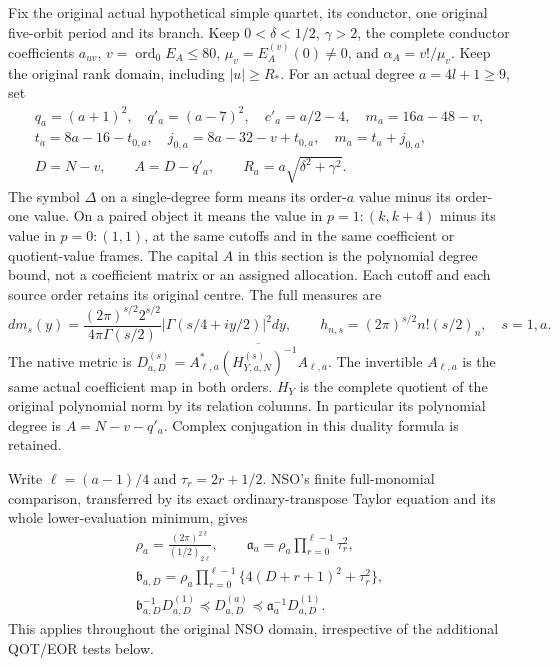 \documentclass[11pt,a4paper]{article}
\begin{document}
Fix the original actual hypothetical simple quartet, its conductor,
one original five-orbit period and its branch. Keep
$0<\delta<1/2$, $\gamma>2$, the complete conductor coefficients
$a_{uv}$, $v=\operatorname{ord}_0E_A\le80$,
$\mu_v=E_A^{(v)}(0)\ne0$, and $\alpha_A=v!/\mu_v$.
Keep the original rank domain, including $|u|\ge R_*$.
For an actual degree $a=4l+1\ge9$, set
\[
\begin{gathered}
q_a=(a+1)^2,\quad q'_a=(a-7)^2,\quad c'_a=a/2-4,\quad
m_a=16a-48-v,\\
t_a=8a-16-t_{0,a},\quad
j_{0,a}=8a-32-v+t_{0,a},\quad m_a=t_a+j_{0,a},\\
D=N-v,\qquad A=D-q'_a,\qquad R_a=a\sqrt{\delta^2+\gamma^2}.
\end{gathered}\tag{EFP1}\label{efp:data}
\]
The symbol $\Delta$ on a single-degree form means its order-$a$ value
minus its order-one value. On a paired object it means the value in
$p=1:(k,k+4)$ minus its value in $p=0:(1,1)$, at the same cutoffs
and in the same coefficient or quotient-value frames.
The capital $A$ in this section is the polynomial degree bound, not a
coefficient matrix or an assigned allocation. Each cutoff and each source
order retains its original centre. The full measures are
\[
dm_s(y)=\frac{(2\pi)^{s/2}2^{s/2}}{4\pi\Gamma(s/2)}
 |\Gamma(s/4+iy/2)|^2dy,\qquad
h_{n,s}=(2\pi)^{s/2}n!(s/2)_n,\quad s=1,a.
\tag{EFP2}\label{efp:measure}
\]
The native metric is
$D_{a,D}^{(s)}=A_{\ell,a}^*\overline{(H_{Y,a,N}^{(s)})^{-1}}A_{\ell,a}$.
The invertible $A_{\ell,a}$ is the same actual coefficient map in both
orders. $H_Y$ is the complete quotient of the original polynomial
norm by its relation columns. In particular its polynomial degree is
$A=N-v-q'_a$. Complex conjugation in this duality formula is retained.

Write $\ell=(a-1)/4$ and $\tau_r=2r+1/2$. NSO's finite full-monomial
comparison, transferred by its exact ordinary-transpose Taylor equation
and its whole lower-evaluation minimum, gives
\[
\begin{gathered}
\rho_a=\frac{(2\pi)^{2\ell}}{(1/2)_{2\ell}},\qquad
\mathfrak a_a=\rho_a\prod_{r=0}^{\ell-1}\tau_r^2,\\
\mathfrak b_{a,D}=\rho_a
 \prod_{r=0}^{\ell-1}\{4(D+r+1)^2+\tau_r^2\},\\
\mathfrak b_{a,D}^{-1}D_{a,D}^{(1)}
 \preceq D_{a,D}^{(a)}
 \preceq\mathfrak a_a^{-1}D_{a,D}^{(1)}.
\end{gathered}\tag{EFP3}\label{efp:nso}
\]
This applies throughout the original NSO domain, irrespective of the
additional QOT/EOR tests below.
\end{document}
